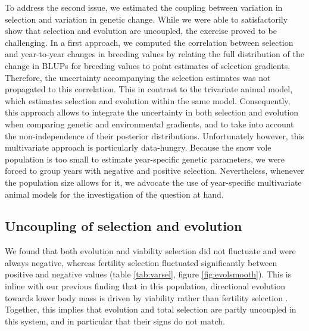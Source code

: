 To address the second issue, we estimated the coupling between variation in selection and variation in  genetic change. While we were able to satisfactorily show that selection and evolution are uncoupled, the exercise proved to be challenging. In a first approach, we computed the correlation between selection and year-to-year changes in breeding values by relating the full distribution of the change in BLUPs for breeding values to point estimates of selection gradients. Therefore, the uncertainty accompanying the selection estimates was not propagated to this correlation. This in contrast to the trivariate animal model, which estimates selection and evolution within the same model. Consequently, this approach allows  to integrate the uncertainty in both selection and evolution when comparing genetic and environmental gradients, and to take into account the non-independence of their posterior distributions. Unfortunately however, this multivariate approach is particularly data-hungry. Because the snow vole population is too small to estimate year-specific genetic parameters, we were forced to group years with negative and positive selection. Nevertheless, whenever the population size allows for it, we advocate the use of year-specific multivariate animal models for the investigation of the question at hand.

\subsection*{Uncoupling of selection and evolution}
We found that both evolution and viability selection did not fluctuate and were always negative, whereas 
fertility selection fluctuated significantly between positive and negative values (table \ref{tab:varsel}, figure \ref{fig:evolsmooth}). 
This is inline with our previous finding that in this population, directional evolution towards lower body mass is driven by viability rather than fertility selection \parencite{Bonnet2016}. Together, this implies that evolution and total selection are partly uncoupled in this system, and in particular that their signs do not match. 

